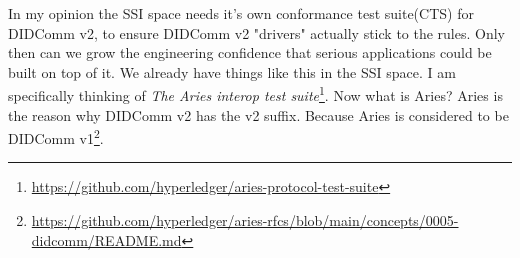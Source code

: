 In my opinion the SSI space needs it's own conformance test suite(CTS) for DIDComm v2, to ensure DIDComm v2 "drivers" actually stick to the rules. Only then can we grow the engineering confidence that serious applications could be built on top of it. We already have things like this in the SSI space. I am specifically thinking of \textit{The Aries interop test suite}\footnote{\url{https://github.com/hyperledger/aries-protocol-test-suite}}. Now what is Aries? Aries is the reason why DIDComm v2 has the v2 suffix. Because Aries is considered to be DIDComm v1\footnote{\url{https://github.com/hyperledger/aries-rfcs/blob/main/concepts/0005-didcomm/README.md}}.